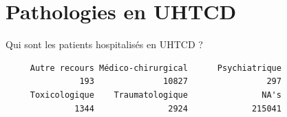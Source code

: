\documentclass[]{article}
\newenvironment{Shaded}{\begin{snugshade}}{\end{snugshade}}
\newcommand{\KeywordTok}[1]{\textcolor[rgb]{0.13,0.29,0.53}{\textbf{{#1}}}}
\newcommand{\StringTok}[1]{\textcolor[rgb]{0.31,0.60,0.02}{{#1}}}
\newcommand{\NormalTok}[1]{{#1}}
\begin{document}
\section{Pathologies en UHTCD}\label{pathologies-en-uhtcd}

Qui sont les patients hospitalisés en UHTCD ?

\begin{Shaded}
\end{Shaded}

\begin{verbatim}
     Autre recours Médico-chirurgical      Psychiatrique 
               193              10827                297 
     Toxicologique    Traumatologique               NA's 
              1344               2924             215041 
\end{verbatim}

\begin{Shaded}
\end{Shaded}
\end{document}
